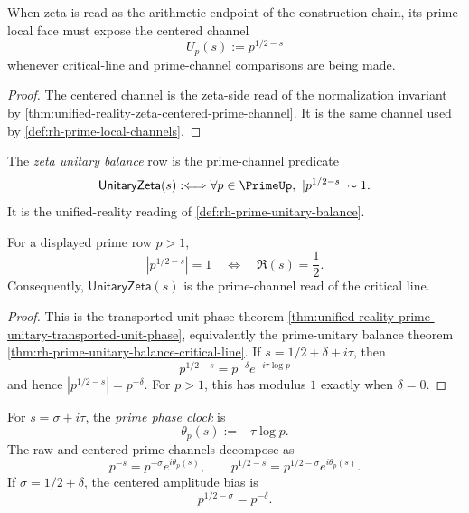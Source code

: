 \begin{corollary}
\label{cor:unified-reality-zeta-centered-channel-read}
When zeta is read as the arithmetic endpoint of the construction chain,
its prime-local face must expose the centered channel
$$
U_p(s):=p^{1/2-s}
$$
whenever critical-line and prime-channel comparisons are being made.
\end{corollary}

\begin{proof}
The centered channel is the zeta-side read of the normalization
invariant by
\autoref{thm:unified-reality-zeta-centered-prime-channel}. It is the
same channel used by
\autoref{def:rh-prime-local-channels}.
\end{proof}

\begin{definition}
\label{def:unified-reality-zeta-unitary-balance}
The \emph{zeta unitary balance} row is the prime-channel predicate
$$
\mathsf{UnitaryZeta}(s)
:\Longleftrightarrow
\forall p\in\PrimeUp,\ |p^{1/2-s}|\sim1.
$$
It is the unified-reality reading of
\autoref{def:rh-prime-unitary-balance}.
\end{definition}

\begin{theorem}
\label{thm:unified-reality-zeta-unitary-critical-line}
For a displayed prime row $p>1$,
$$
|p^{1/2-s}|=1
\quad\Longleftrightarrow\quad
\Re(s)=\frac12.
$$
Consequently, $\mathsf{UnitaryZeta}(s)$ is the prime-channel read of the
critical line.
\end{theorem}

\begin{proof}
This is the transported unit-phase theorem
\autoref{thm:unified-reality-prime-unitary-transported-unit-phase},
equivalently the prime-unitary balance theorem
\autoref{thm:rh-prime-unitary-balance-critical-line}. If
$s=1/2+\delta+i\tau$, then
$$
p^{1/2-s}=p^{-\delta}e^{-i\tau\log p}
$$
and hence $|p^{1/2-s}|=p^{-\delta}$. For $p>1$, this has modulus $1$
exactly when $\delta=0$.
\end{proof}

\begin{definition}
\label{def:unified-reality-zeta-phase-clock-centered-bias}
For $s=\sigma+i\tau$, the \emph{prime phase clock} is
$$
\theta_p(s):=-\tau\log p.
$$
The raw and centered prime channels decompose as
$$
p^{-s}=p^{-\sigma}e^{i\theta_p(s)},
\qquad
p^{1/2-s}=p^{1/2-\sigma}e^{i\theta_p(s)}.
$$
If $\sigma=1/2+\delta$, the centered amplitude bias is
$$
p^{1/2-\sigma}=p^{-\delta}.
$$
\end{definition}


